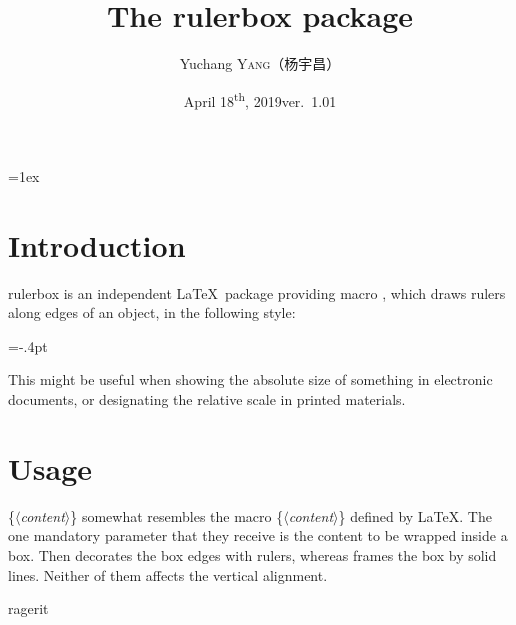 \documentclass[a4paper,11pt]{article}
\title{\hspace*{1cm}The \textsf{rulerbox} package\footnotemark[1]\hspace*{1cm}}
\author{Yuchang \textsc{Yang}{\fontspec{SimSun}（杨宇昌）\kern-5pt\footnotemark[2]}}
\date{April 18\textsuperscript{th}, 2019\qquad ver.~1.01}
\def\lan{\ensuremath{\langle}}
\def\ran{\ensuremath{\rangle}}
\def\param#1{\textrm{\lan\textit{#1}\ran}}
\def\texttt#1{{\ttfamily\color{darkmiku}#1}}
\begin{document}
\parskip=1ex


\section{Introduction}
	\textsf{rulerbox} is an independent \LaTeX\ package providing macro \texttt{\string{}}, which draws rulers along edges of an object, in the following style:\par
	\vskip-1mm
	\centerline{{=-.4pt}}
	\smallskip
	This might be useful when showing the absolute size of something in electronic documents, or designating the relative scale in printed materials.
	
\section{Usage}

	\texttt{\string{}\{\param{content}\}} somewhat resembles the macro \texttt{\string\fbox\{\param{content}\}} defined by \LaTeX. The one mandatory parameter that they receive is the content to be wrapped inside a box. Then \texttt{\string{}} decorates the box edges with rulers, whereas \texttt{\string\fbox} frames the box by solid lines. Neither of them affects the vertical alignment.\par
	\medskip
	\centerline{\fontsize{50}{50}\selectfont ragerit}
	
\end{document}
